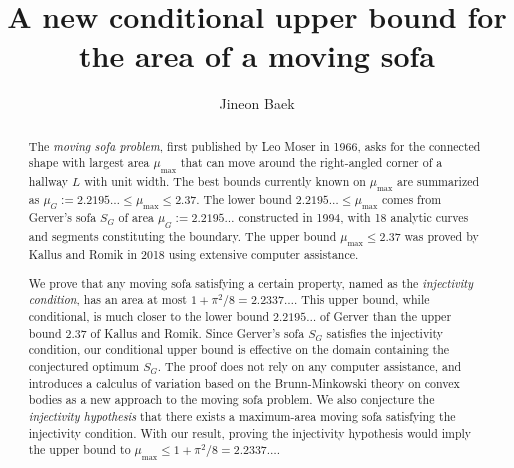 \documentclass[10pt]{report}
\title{A new conditional upper bound for the area of a moving sofa}
\author{Jineon Baek}
\theoremstyle{plain}
\theoremstyle{definition}
\theoremstyle{remark}
\begin{document}
\maketitle

\begin{abstract}
The \emph{moving sofa problem}, first published by Leo Moser in 1966,
asks for the connected shape with largest area $\mu_{\text{max}}$ that can move around the
right-angled corner of a hallway $L$ with unit width.
The best bounds currently known on $\mu_{\max}$ are summarized as
$\mu_G := 2.2195\ldots \leq \mu_{\max} \leq 2.37$.
The lower bound $2.2195\ldots \leq \mu_{\max}$ comes from Gerver's sofa $S_G$ of area $\mu_G :=
2.2195\ldots$ constructed in 1994, with 18 analytic curves and segments constituting the boundary.
The upper bound $\mu_{\max} \leq 2.37$ was proved by Kallus and Romik in 2018
using extensive computer assistance.

We prove that any moving sofa satisfying a certain property, named as the
\emph{injectivity condition},
has an area at most $1 + \pi^2/8 =
2.2337\ldots$. This upper bound, while conditional, is much closer to the lower bound $2.2195\ldots$
of Gerver than the upper bound $2.37$ of Kallus and Romik. Since Gerver's sofa $S_G$ satisfies the
injectivity condition, our conditional upper bound is effective on the domain containing the
conjectured optimum $S_G$. The proof does not rely on any computer assistance, and introduces a
calculus of variation based on the Brunn-Minkowski theory on convex bodies as a new approach to the
moving sofa problem. We also conjecture the \emph{injectivity hypothesis}
that there exists a maximum-area moving sofa satisfying the injectivity
condition. With our result, proving the injectivity hypothesis would imply the upper bound
to $\mu_{\max} \leq 1 + \pi^2/8 = 2.2337\ldots$.
\end{abstract}

\tableofcontents



\printbibliography
\end{document}

